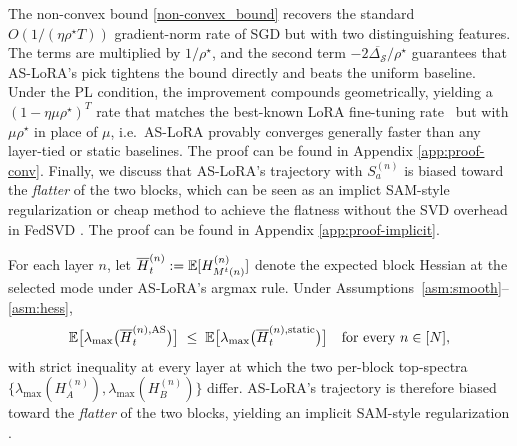The non-convex bound \eqref{non-convex_bound} recovers the standard $O(1/(\eta\rho^\star T))$ gradient-norm rate of SGD \citep{karimi2016pl} but with two distinguishing features. The terms are multiplied by $1/\rho^{\star}$, and the second term $-2\overline{\Delta_{\mathcal S}}/\rho^\star$ guarantees that AS-LoRA's pick tightens the bound directly and beats the uniform baseline. Under the PL condition, the improvement compounds geometrically, yielding a $(1-\eta\mu\rho^\star)^T$ rate that matches the best-known LoRA fine-tuning rate~\citep{liu2022loss,hayou2024lora+} but with $\mu\rho^\star$ in place of $\mu$, i.e.\ AS-LoRA provably converges generally faster than any layer-tied or static baselines. The proof can be found in Appendix \ref{app:proof-conv}. Finally, we discuss that AS-LoRA's trajectory with $S_a^{(n)}$ is biased toward the \emph{flatter} of the two blocks, which can be seen as an implict SAM-style regularization \cite{foret2021sam} or cheap method to achieve the flatness without the SVD overhead in FedSVD \cite{lee2025fedsvd}. The proof can be found in Appendix \ref{app:proof-implicit}.


\begin{theorem}\label{thm:implicit}
For each layer $n$, let $\overline H_t^{(n)} := \mathbb{E}[H_{M^t(n)}^{(n)}]$ denote the expected block Hessian at the selected mode under AS-LoRA's argmax rule. Under Assumptions~\ref{asm:smooth}--\ref{asm:hess},
\begin{equation}    
\mathbb{E}\bigl[\lambda_{\max}\bigl(\overline H_t^{(n),\text{AS}}\bigr)\bigr] \;\le\; \mathbb{E}\bigl[\lambda_{\max}\bigl(\overline H_t^{(n),\text{static}}\bigr)\bigr] \quad\text{for every } n\in[N],
\end{equation}
with strict inequality at every layer at which the two per-block top-spectra $\{\lambda_{\max}(H_A^{(n)}), \lambda_{\max}(H_B^{(n)})\}$ differ. AS-LoRA's trajectory is therefore biased toward the \emph{flatter} of the two blocks, yielding an implicit SAM-style regularization \citep{foret2021sam}.
\end{theorem}

